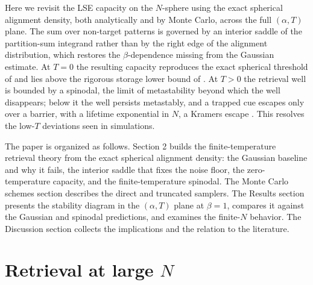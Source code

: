 \documentclass[letterpaper]{article} %
\newcommand{\Bnet}{\beta}
\begin{document}
Here we revisit the LSE capacity on the $N$-sphere using the exact spherical
alignment density, both analytically and by Monte Carlo, across the full
$(\alpha, T)$ plane. The sum over non-target patterns is governed by an interior
saddle of the partition-sum integrand rather than by the right edge of the
alignment distribution, which restores the $\Bnet$-dependence missing from the
Gaussian estimate. At $T = 0$ the resulting capacity reproduces the exact
spherical threshold of \citet{lucibello2024exponential} and lies above the
rigorous storage lower bound of \citet{ramsauer2021hopfield}. At $T > 0$ the
retrieval well is bounded by a spinodal, the limit of metastability beyond which
the well disappears; below it the well persists metastably, and a trapped cue
escapes only over a barrier, with a lifetime exponential in $N$, a Kramers escape
\citep{kramers1940, hanggi1990}. This resolves the low-$T$ deviations seen in
simulations.

The paper is organized as follows. Section 2 builds the
finite-temperature retrieval theory from the exact spherical alignment density:
the Gaussian baseline and why it fails, the interior saddle that fixes the noise
floor, the zero-temperature capacity, and the finite-temperature spinodal. The
Monte Carlo schemes section describes the direct and truncated samplers. The
Results section presents the stability diagram in the $(\alpha, T)$ plane at
$\Bnet = 1$, compares it against the Gaussian and spinodal predictions, and
examines the finite-$N$ behavior. The Discussion section collects the
implications and the relation to the literature.


\section{Retrieval at large $N$}
\end{document}
